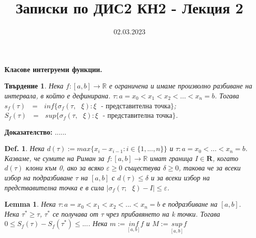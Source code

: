 \documentclass[12pt]{article}
\newtheorem{proposition}{Твърдение}
\newtheorem{definition}{Def.}
\newtheorem{lemma}{Lemma}
\newcommand{\spc}{\text{ }}
\begin{document}
	\color{white}
	\pagecolor{darkgray}
	\title{Записки по ДИС2 КН2 - Лекция 2}
	\date{02.03.2023}
	\maketitle
	\begin{center}
		\Large
		\textbf{Класове интегруеми функции. }
	\end{center}

	\begin{proposition}
		Нека $f:\left[a, b\right] \rightarrow \mathbb{R}$ е ограничена и имаме произволно разбиване на интервала, в който е дефинирана.
		$\tau : a=x_{0}<x_{1}<x_{2}<...<x_{n}=b$.
		Тогава $s_{f}\left(\tau\right)\spc=\spc inf\{\sigma_{f}\left(\tau,\spc\xi\right) : \xi\spc\text{- представителна точка}\}$;
		$S_{f}\left(\tau\right)\spc=\spc sup\{\sigma_{f}\left(\tau,\spc\xi\right) : \xi\spc\text{- представителна точка}\}$.
	\end{proposition}
	\textbf{Доказателство:} ......
	
	\begin{definition}
		Нека $d\left(\tau\right) := max\{x_{i}-x_{i-1} : i\in\{1,...,n\}\}$ и $\tau : a=x_{0}<...<x_{n}=b$. Казваме, че сумите на Риман за $f: \left[a, b\right] \rightarrow \mathbb{R}$ имат граница $I\in\mathbf{R}$, когато $d\left(\tau\right)$ клони към 0, ако за всяко $\varepsilon\geq 0$ съществува $\delta\geq 0$, такова че за всеки избор на подразбиване $\tau$ на $\left[a, b\right]$ с $d\left(\tau\right)\leq\delta$ и за всеки избор на предствавителна точка е в сила $|\sigma_{f}\left(\tau;\spc\xi\right)-I|\leq\varepsilon$.
	\end{definition}
	
	\begin{lemma}
		Нека $\tau : a=x_{0}<x_{1}<x_{2}<...<x_{n}=b$ е подразбиване на $\left[a, b\right]$. Нека $\tau^{*}\geq\tau$, $\tau^{*}$ се получава от $\tau$ чрез прибавянето на k точки. Тогава $0\leq S_{f}\left(\tau\right)-S_{f}\left(\tau^{*}\right)\leq...$.
		Нека $m := \underset{\left[a, b\right]}{inf} f$ и $M := \underset{\left[a, b\right]}{sup} f$
	\end{lemma}
\end{document}
